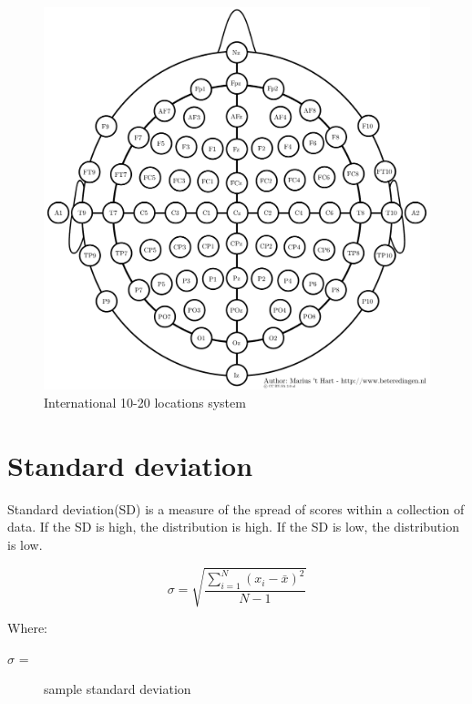 \begin{figure}[ht]
	\centering
	\includegraphics[scale = 0.5]{chapter3/35.pdf}
	\caption{International 10-20 locations system\cite{ref15}}
\end{figure}

\newpage
\section{Standard deviation}
\hspace{1.5cm} Standard deviation(SD) is a measure of the spread of scores within a collection of data. If the SD is high, the distribution is high. If the SD is low, the distribution is low.



\begin{equation}\label{3}
	 \sigma = \sqrt{\frac{ \sum ^{N}_{i=1} (x_{i} - \bar{x})^2}{N - 1}} 
\end{equation}

Where:
\begin{description}
	\item [$\sigma$ = ]  sample standard deviation
\end{description}

